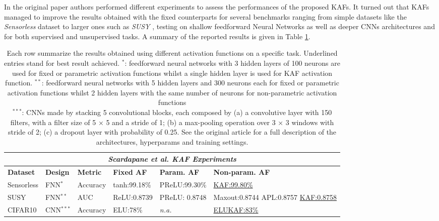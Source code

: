 \documentclass[LaM,binding=0.6cm]{./packages/sapthesis/sapthesis}
\begin{document}
    In the original paper authors performed different experiments to assess the performances of the proposed KAFs.
    It turned out that KAFs managed to improve the results obtained with the fixed counterparts for several benchmarks ranging from simple datasets 
    like the \textit{Sensorless} dataset  to larger ones such as \textit{SUSY} \cite{susy}, testing on shallow feedforward Neural Networks
    as well as deeper CNNs architectures and for both supervised and unsupervised tasks. A summary of the reported results is given in Table \ref{tab:scardapanekafexp}.  
    
    \begin{table}
        \begin{tabular}{ |p{1.5cm}||p{2cm}|p{1.6cm}|p{2.3cm}|p{2.5cm}|p{2.8cm}|  }
            \hline
            \multicolumn{6}{|c|}{\textit{Scardapane et al. KAF Experiments}} \\
            \hline
            \textbf{Dataset} & \textbf{Design} & \textbf{Metric} & \textbf{Fixed AF}& \textbf{Param. AF} & \textbf{Non-param. AF}\\
            \hline
            \hline
            Sensorless & FNN$^*$  &Accuracy&tanh:99.18\% &PReLU:99.30\% & \underline{ KAF:99.80\% } \\
            \hline
            SUSY&   FNN$^{**} $ &AUC&ReLU:0.8739 & PReLU: 0.8748&Maxout:0.8744 APL:0.8757 \underline{KAF:0.8758} \\
            \hline
            CIFAR10 & CNN$^{***}$ &Accuracy&ELU:78\% & \textit{n.a.} & \underline{ELUKAF:83\%} \\
            \hline
        \end{tabular}
        \caption{Each row summarize the results obtained using different activation functions on a specific task. 
        Underlined entries stand for best result achieved.
        $^*$: feedforward neural networks with 3 hidden layers of 100 neurons are used for fixed or parametric activation functions whilst a single hidden layer is used 
        for KAF activation function.
        $^{**}$: feedforward neural networks with 5 hidden layers and 300 neurons each for fixed or parametric activation functions whilst 2 hidden layers with the same
        number of neurons for non-parametric activation functions \\
        $^{***}$: CNNs made by stacking 5 convolutional blocks, each composed by (a) a convolutive layer with 150 filters, with a
        filter size of 5 × 5 and a stride of 1; (b) a max-pooling operation over 3 × 3
        windows with stride of 2; (c) a dropout layer with probability of 0.25. See the original article for a full description of the architectures, hyperparams and training
        settings.}
        \label{tab:scardapanekafexp}
    \end{table}
       
\end{document}
